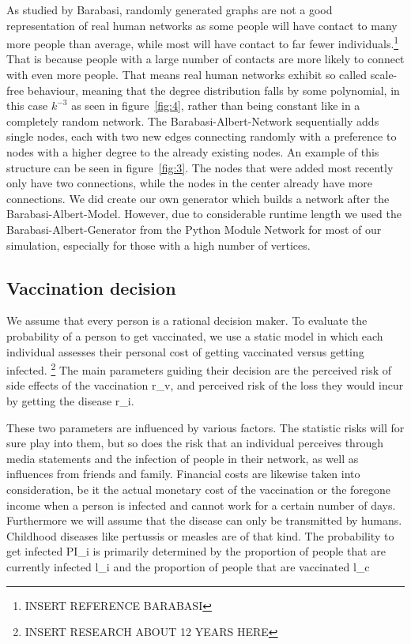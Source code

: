 \documentclass[11pt]{article}
\begin{document}
As studied by Barabasi, randomly generated graphs are not a good representation of real human networks as some people will have contact to many more people than average, while most will have contact to far fewer individuals.\footnote{INSERT REFERENCE BARABASI} That is because people with a large number of contacts are more likely to connect with even more people. That means real human networks exhibit so called scale-free behaviour, meaning that the degree distribution falls by some polynomial, in this case $k^{-3}$ as seen in figure~\ref{fig:4}, rather than being constant like in a completely random network.  The Barabasi-Albert-Network sequentially adds single nodes, each with two new edges connecting randomly with a preference to nodes with a higher degree to the already existing nodes. An example of this structure can be seen in figure~\ref{fig:3}. The nodes that were added most recently only have two connections, while the nodes in the center already have more connections. We did create our own generator which builds a network after the Barabasi-Albert-Model. However, due to considerable runtime length we used the Barabasi-Albert-Generator from the Python Module Network for most of our simulation, especially for those with a high number of vertices.
\vspace{14px}




\subsection{Vaccination decision}

We assume that every person is a rational decision maker. To evaluate the probability of a person to get vaccinated, we use a static model in which each individual assesses their personal cost of getting vaccinated versus getting infected.  \footnote{INSERT RESEARCH ABOUT 12 YEARS HERE}  The main parameters guiding their decision are the perceived risk of side effects of the vaccination r\_v, and perceived risk of the loss they would incur by getting the disease r\_i.

These two parameters are influenced by various factors. The statistic risks will for sure play into them, but so does the risk that an individual perceives through media statements and
the infection of people in their network, as well as influences from friends and family. Financial costs are likewise taken into consideration, be it the actual monetary cost of the vaccination or the foregone income when a person is infected and cannot work for a certain number of days. Furthermore we will assume that the disease can only be transmitted by humans. Childhood diseases like pertussis or measles are of that kind. 
The probability to get infected PI\_i is primarily determined by the proportion of people that are currently infected l\_i and the proportion of people that are vaccinated l\_c
\end{document}
